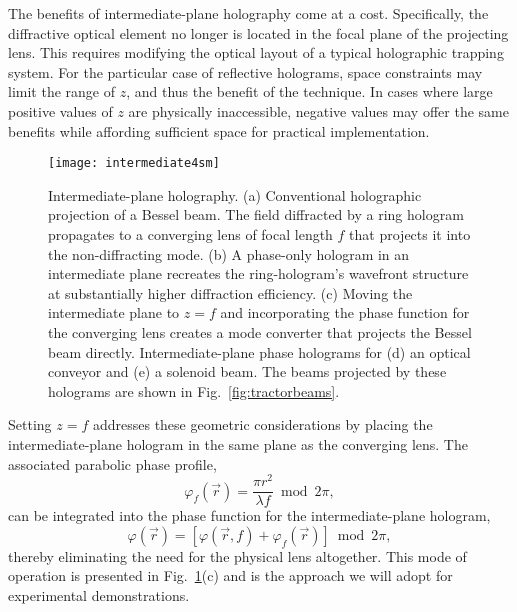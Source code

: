 The benefits of intermediate-plane holography come at
a cost.  Specifically, the diffractive optical element no
longer is located in the focal plane of the projecting
lens.  This requires modifying the optical layout of a typical
holographic trapping system.
For the particular case of reflective holograms,
space constraints may limit the range of $z$,
and thus the benefit of the technique.
In cases where large positive values of $z$ are 
physically inaccessible,
negative values may offer the same benefits while
affording sufficient space for practical implementation.

\begin{figure}[t!]
  \centering
  \texttt{[image: intermediate4sm]}
  \caption{Intermediate-plane holography. (a) Conventional
    holographic projection of a Bessel beam.  The field diffracted
    by a ring hologram propagates to a converging lens of
    focal length $f$ that
    projects it into the non-diffracting mode.
    (b) A phase-only hologram
    in an intermediate plane recreates the ring-hologram's
    wavefront structure at substantially higher diffraction efficiency.
    (c) Moving the intermediate plane to $z = f$ and incorporating
    the phase function for the converging lens
    creates a mode converter that projects the Bessel beam directly.
    Intermediate-plane phase holograms for
    (d) an optical conveyor and (e) a solenoid beam.  The beams
    projected by these holograms are shown in Fig.~\ref{fig:tractorbeams}.}
  \label{fig:intermediate}
\end{figure}

Setting $z = f$ addresses these geometric considerations
by placing the intermediate-plane hologram
in the same plane as the converging lens.
The associated parabolic phase profile,
\begin{equation}
  \label{eq:lensphase}
  \varphi_f(\vec{r}) = \frac{\pi r^2}{\lambda f}
  \bmod 2 \pi,
\end{equation}
can be integrated into the phase function
for the intermediate-plane hologram, 
\begin{equation}
  \label{eq:complete}
  \varphi(\vec{r}) 
  =
  \left[\varphi(\vec{r},f) +
  \varphi_f(\vec{r}) \right]
  \bmod 2 \pi, 
\end{equation}
thereby eliminating the need for
the physical lens altogether.
This mode of operation is presented in
Fig.~\ref{fig:intermediate}(c) and is the
approach we will adopt for experimental demonstrations.

